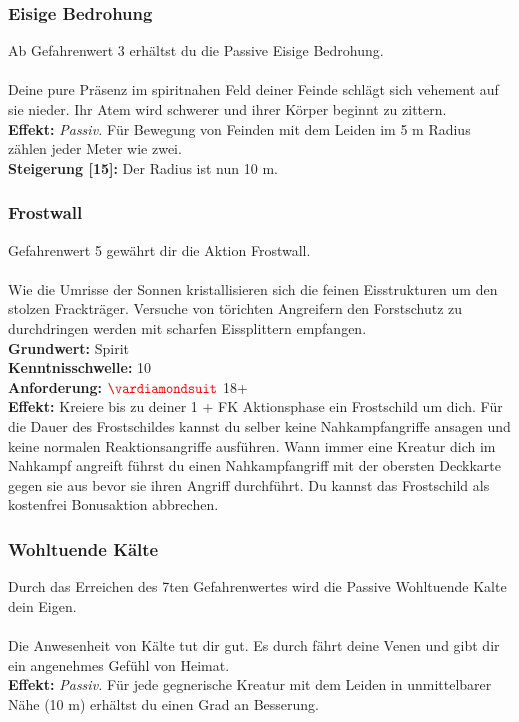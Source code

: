\subsubsection*{ Eisige Bedrohung} \label{sk:eisige_bedrohung}
Ab Gefahrenwert 3 erhältst du die Passive Eisige Bedrohung.\\
\\
Deine pure Präsenz im spiritnahen Feld deiner Feinde schlägt sich vehement auf sie nieder. Ihr Atem wird schwerer und ihrer Körper beginnt zu zittern.\\
\textbf{Effekt:} \textit{Passiv.} Für Bewegung von Feinden mit dem Leiden  im 5 m Radius zählen jeder Meter wie zwei.\\
\textbf{Steigerung [15]:} Der Radius ist nun 10 m.

\subsubsection*{ Frostwall} \label{sk:frostwall}
Gefahrenwert 5 gewährt dir die Aktion Frostwall.\\
\\
Wie die Umrisse der Sonnen kristallisieren sich die feinen Eisstrukturen um den stolzen Frackträger. Versuche von törichten Angreifern den Forstschutz zu durchdringen werden mit scharfen Eissplittern empfangen. \\
\textbf{Grundwert:} Spirit\\
\textbf{Kenntnisschwelle:} 10 \\
\textbf{Anforderung:} $\Karo{}$ 18+ \\
\textbf{Effekt:} Kreiere bis zu deiner 1 + FK Aktionsphase ein Frostschild um dich. Für die Dauer des Frostschildes kannst du selber keine Nahkampfangriffe ansagen und keine normalen Reaktionsangriffe ausführen. Wann immer eine Kreatur dich im Nahkampf angreift führst du einen Nahkampfangriff mit der obersten Deckkarte gegen sie aus bevor sie ihren Angriff durchführt. Du kannst das Frostschild als kostenfrei Bonusaktion abbrechen.

\subsubsection*{ Wohltuende Kälte} \label{sk:wohltuende_kaelte}
Durch das Erreichen des 7ten Gefahrenwertes wird die Passive Wohltuende Kalte dein Eigen.\\
\\
Die Anwesenheit von Kälte tut dir gut. Es durch fährt deine Venen und gibt dir ein angenehmes Gefühl von Heimat.\\
\textbf{Effekt:} \textit{Passiv.} Für jede gegnerische Kreatur mit dem Leiden  in unmittelbarer Nähe (10 m) erhältst du einen Grad an Besserung.

